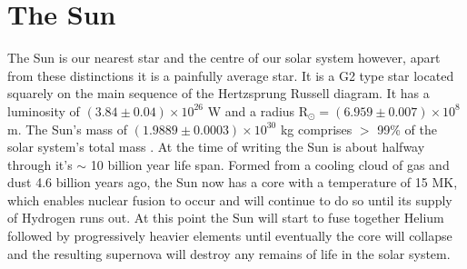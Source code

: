 \section{The Sun}
The Sun is our nearest star and the centre of our solar system however, apart from these distinctions it is a painfully average star. It is a G2 type star located squarely on the main sequence of the Hertzsprung Russell diagram. It has a luminosity of $(3.84 \pm 0.04) \times 10^{26}$ W and a radius R$_\odot = (6.959 \pm 0.007) \times 10^8$ m. The Sun's mass of $(1.9889 \pm 0.0003) \times 10^{30}$ kg comprises $>$ 99\% of the solar system's total mass \citep{Foukal2004}. At the time of writing the Sun is about halfway through it's $\sim$ 10 billion year life span. Formed from a cooling cloud of gas and dust 4.6 billion years ago, the Sun now has a core with a temperature of 15 MK, which enables nuclear fusion to occur and will continue to do so until its supply of Hydrogen runs out. At this point the Sun will start to fuse together Helium followed by progressively heavier elements until eventually the core will collapse and the resulting supernova will destroy any remains of life in the solar system.  %

